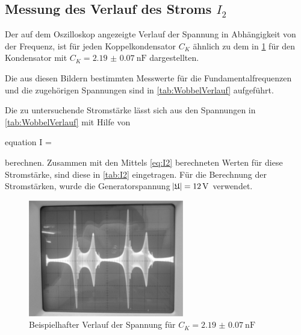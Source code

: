 	
	
\subsection{Messung des Verlauf des Stroms $I_{2}$} \label{sec:Auswertung_Wobbel}
	
	Der auf dem Oszilloskop angezeigte Verlauf der Spannung in Abhängigkeit von der Frequenz, ist für jeden 
	Koppelkondensator $C_{K}$ ähnlich zu dem in \cref{fig:WobbelVerlauf} für den Kondensator mit 
	$C_{K} = \SI{2.19(7)}{\nano\farad}$ dargestellten.
	

	Die aus diesen Bildern bestimmten Messwerte für die Fundamentalfrequenzen und die zugehörigen Spannungen
	sind in \cref{tab:WobbelVerlauf} aufgeführt.  

	
	
	Die zu untersuchende Stromstärke lässt sich aus den Spannungen in \cref{tab:WobbelVerlauf} mit Hilfe von
	\begin{empheq}{equation}
		I =  
	\end{empheq}  
	berechnen. Zusammen mit den Mittels \cref{eq:I2} berechneten Werten für diese Stromstärke, sind diese in
	\cref{tab:I2} eingetragen. Für die Berechnung der Stromstärken, wurde die Generatorspannung $\envert{\mathfrak{U}} = \SI{12}{\volt}$ verwendet. 
	
		
	
	\begin{figure}
			\centering
			\includegraphics[scale=0.8]{Grafiken/Kondensator2.jpg}
			\caption{Beispielhafter Verlauf der Spannung für $C_{K} = \SI{2.19(7)}{\nano\farad}$ }
			\label{fig:WobbelVerlauf}
	\end{figure}
	